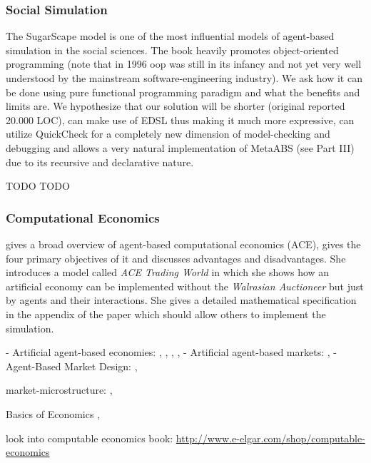 \subsubsection{Social Simulation}
The SugarScape model \cite{epstein_growing_1996} is one of the most influential models of agent-based simulation in the social sciences. The book heavily promotes object-oriented programming (note that in 1996 oop was still in its infancy and not yet very well understood by the mainstream software-engineering industry). We ask how it can be done using pure functional programming paradigm and what the benefits and limits are. We hypothesize that our solution will be shorter (original reported 20.000 LOC), can make use of EDSL thus making it much more expressive, can utilize QuickCheck for a completely new dimension of model-checking and debugging and allows a very natural implementation of MetaABS (see Part III) due to its recursive and declarative nature.

TODO \cite{huberman_evolutionary_1993} 
TODO \cite{nowak_evolutionary_1992}
\subsubsection{Computational Economics}
\cite{tesfatsion_agent-based_2006} gives a broad overview of agent-based computational economics (ACE), gives the four primary objectives of it and discusses advantages and disadvantages. She introduces a model called \textit{ACE Trading World} in which she shows how an artificial economy can be implemented without the \textit{Walrasian Auctioneer} but just by agents and their interactions. She gives a detailed mathematical specification in the appendix of the paper which should allow others to implement the simulation.

- Artificial agent-based economies: \cite{tesfatsion_agent-based_2006}, \cite{gintis_emergence_2006}, \cite{gintis_dynamics_2007}, \cite{gaffeo_adaptive_2008}, \cite{botta_functional_2011}
- Artificial agent-based markets: \cite{mackie-mason_chapter_2006}, \cite{darley_nasdaq_2007}
- Agent-Based Market Design: \cite{marks_chapter_2006}, \cite{budish_editors_2015}

market-microstructure: \cite{LehalleLaruelle2013}, \cite{baker_market_2013}

Basics of Economics \cite{bowles_understanding_2005}, \cite{kirman_complex_2010}

look into computable economics book: \url{http://www.e-elgar.com/shop/computable-economics}

